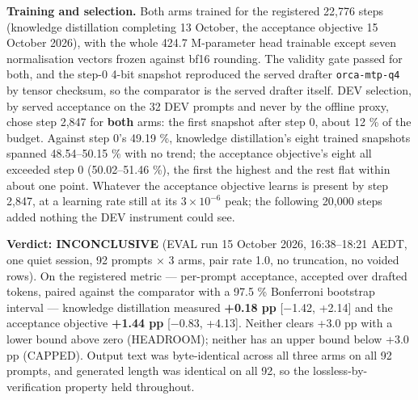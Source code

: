 \documentclass[
  11pt,
]{article}
\begin{document}
\textbf{Training and selection.} Both arms trained for the registered
22,776 steps (knowledge distillation completing 13 October, the
acceptance objective 15 October 2026), with the whole 424.7 M-parameter
head trainable except seven normalisation vectors frozen against bf16
rounding. The validity gate passed for both, and the step-0 4-bit
snapshot reproduced the served drafter \texttt{orca-mtp-q4} by tensor
checksum, so the comparator is the served drafter itself. DEV selection,
by served acceptance on the 32 DEV prompts and never by the offline
proxy, chose step 2,847 for \textbf{both} arms: the first snapshot after
step 0, about 12 \% of the budget. Against step 0's 49.19 \%, knowledge
distillation's eight trained snapshots spanned 48.54--50.15 \% with no
trend; the acceptance objective's eight all exceeded step 0
(50.02--51.46 \%), the first the highest and the rest flat within about
one point. Whatever the acceptance objective learns is present by step
2,847, at a learning rate still at its \(3 \times 10^{-6}\) peak; the
following 20,000 steps added nothing the DEV instrument could see.

\textbf{Verdict: INCONCLUSIVE} (EVAL run 15 October 2026, 16:38--18:21
AEDT, one quiet session, 92 prompts × 3 arms, pair rate 1.0, no
truncation, no voided rows). On the registered metric --- per-prompt
acceptance, accepted over drafted tokens, paired against the comparator
with a 97.5 \% Bonferroni bootstrap interval --- knowledge distillation
measured \textbf{+0.18 pp} {[}−1.42, +2.14{]} and the acceptance
objective \textbf{+1.44 pp} {[}−0.83, +4.13{]}. Neither clears +3.0 pp
with a lower bound above zero (HEADROOM); neither has an upper bound
below +3.0 pp (CAPPED). Output text was byte-identical across all three
arms on all 92 prompts, and generated length was identical on all 92, so
the lossless-by-verification property held throughout.
\end{document}
